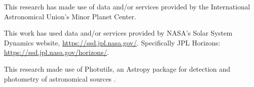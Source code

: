 \documentclass{UCreport}
\begin{document}
This research has made use of data and/or services provided by the International Astronomical Union's Minor Planet Center.

This work has used data and/or services provided by NASA's Solar System Dynamics website, \url{https://ssd.jpl.nasa.gov/}. Specifically JPL Horizons: \url{https://ssd.jpl.nasa.gov/horizons/}.

This research made use of Photutils, an Astropy package for detection and photometry of astronomical sources \citep{Bradley2024}.

% 

\end{document}
